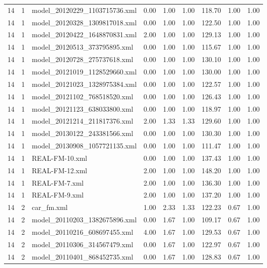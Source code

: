 \begin{table}[ht]
\begin{tabular}{rrlrrrrrr}
   14 &   1 & model\_20120229\_1103715736.xml & 0.00 & 1.00 & 1.00 & 118.70 & 1.00 & 1.00 \\ 
   14 &   1 & model\_20120328\_1309817018.xml & 0.00 & 1.00 & 1.00 & 122.50 & 1.00 & 1.00 \\ 
   14 &   1 & model\_20120422\_1648870831.xml & 2.00 & 1.00 & 1.00 & 129.13 & 1.00 & 1.00 \\ 
   14 &   1 & model\_20120513\_373795895.xml & 0.00 & 1.00 & 1.00 & 115.67 & 1.00 & 1.00 \\ 
   14 &   1 & model\_20120728\_275737618.xml & 0.00 & 1.00 & 1.00 & 130.10 & 1.00 & 1.00 \\ 
   14 &   1 & model\_20121019\_1128529660.xml & 0.00 & 1.00 & 1.00 & 130.00 & 1.00 & 1.00 \\ 
   14 &   1 & model\_20121023\_1328975384.xml & 0.00 & 1.00 & 1.00 & 122.57 & 1.00 & 1.00 \\ 
   14 &   1 & model\_20121102\_768518520.xml & 0.00 & 1.00 & 1.00 & 126.43 & 1.00 & 1.00 \\ 
   14 &   1 & model\_20121123\_638033800.xml & 0.00 & 1.00 & 1.00 & 118.97 & 1.00 & 1.00 \\ 
   14 &   1 & model\_20121214\_211817376.xml & 2.00 & 1.33 & 1.33 & 129.60 & 1.00 & 1.00 \\ 
   14 &   1 & model\_20130122\_243381566.xml & 0.00 & 1.00 & 1.00 & 130.30 & 1.00 & 1.00 \\ 
   14 &   1 & model\_20130908\_1057721135.xml & 0.00 & 1.00 & 1.00 & 111.47 & 1.00 & 1.00 \\ 
   14 &   1 & REAL-FM-10.xml & 0.00 & 1.00 & 1.00 & 137.43 & 1.00 & 1.00 \\ 
   14 &   1 & REAL-FM-12.xml & 2.00 & 1.00 & 1.00 & 148.20 & 1.00 & 1.00 \\ 
   14 &   1 & REAL-FM-7.xml & 2.00 & 1.00 & 1.00 & 136.30 & 1.00 & 1.00 \\ 
   14 &   1 & REAL-FM-9.xml & 2.00 & 1.00 & 1.00 & 137.20 & 1.00 & 1.00 \\ 
   14 &   2 & car\_fm.xml & 1.00 & 2.33 & 1.33 & 122.23 & 0.67 & 1.00 \\ 
   14 &   2 & model\_20110203\_1382675896.xml & 0.00 & 1.67 & 1.00 & 109.17 & 0.67 & 1.00 \\ 
   14 &   2 & model\_20110216\_608697455.xml & 4.00 & 1.67 & 1.00 & 129.53 & 0.67 & 1.00 \\ 
   14 &   2 & model\_20110306\_314567479.xml & 0.00 & 1.67 & 1.00 & 122.97 & 0.67 & 1.00 \\ 
   14 &   2 & model\_20110401\_868452735.xml & 0.00 & 1.67 & 1.00 & 128.83 & 0.67 & 1.00 \\ 

\end{tabular}
\end{table}
